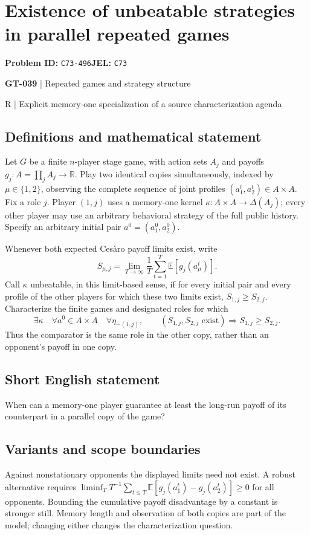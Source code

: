 \documentclass[11pt,a4paper]{article}
\begin{document}
\section*{Existence of unbeatable strategies in parallel repeated games}
\textbf{Problem ID:} \texttt{C73-496}\quad \textbf{JEL:} \texttt{C73}\par
\label{problem:OP-0169}
\label{game:GT-039}
{\sffamily\small\color{muted}
{\sffamily\small\color{muted}\textbf{GT-039} | Repeated games and strategy structure\par R | Explicit memory-one specialization of a source characterization agenda\par}
\par}
\subsection*{Definitions and mathematical statement}
Let $G$ be a finite $n$-player stage game, with action sets $A_j$ and payoffs $g_j:A=\prod_jA_j\to\mathbb R$. Play two identical copies simultaneously, indexed by $\mu\in\{1,2\}$, observing the complete sequence of joint profiles $(a_1^t,a_2^t)\in A\times A$. Fix a role $j$. Player $(1,j)$ uses a memory-one kernel $\kappa:A\times A\to\Delta(A_j)$; every other player may use an arbitrary behavioral strategy of the full public history. Specify an arbitrary initial pair $a^0=(a_1^0,a_2^0)$.

Whenever both expected Ces\`aro payoff limits exist, write
\[
 S_{\mu,j}=\lim_{T\to\infty}\frac1T\sum_{t=1}^{T}\mathbb E[g_j(a_\mu^t)].
\]
Call $\kappa$ unbeatable, in this limit-based sense, if for every initial pair and every profile of the other players for which these two limits exist, $S_{1,j}\geq S_{2,j}$. Characterize the finite games and designated roles for which
\[
 \exists\kappa\quad\forall a^0\in A\times A\quad\forall\eta_{-(1,j)},
 \qquad (S_{1,j},S_{2,j}\text{ exist})\Longrightarrow S_{1,j}\geq S_{2,j}.
\]
Thus the comparator is the same role in the other copy, rather than an opponent's payoff in one copy.
\subsection*{Short English statement}
When can a memory-one player guarantee at least the long-run payoff of its counterpart in a parallel copy of the game?
\subsection*{Variants and scope boundaries}
Against nonstationary opponents the displayed limits need not exist. A robust alternative requires $\liminf_T T^{-1}\sum_{t\leq T}\mathbb E[g_j(a_1^t)-g_j(a_2^t)]\geq0$ for all opponents. Bounding the cumulative payoff disadvantage by a constant is stronger still. Memory length and observation of both copies are part of the model; changing either changes the characterization question.
\end{document}
